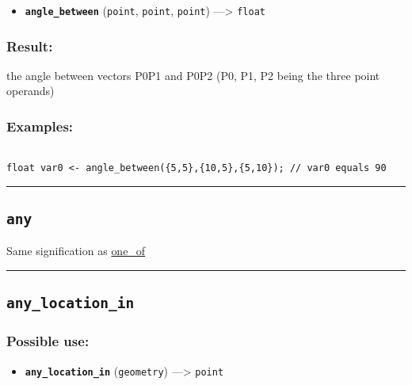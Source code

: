 \documentclass[]{book}
\providecommand{\tightlist}{%
  \setlength{\itemsep}{0pt}\setlength{\parskip}{0pt}}
\theoremstyle{definition}
\theoremstyle{definition}
\theoremstyle{definition}
\theoremstyle{remark}
\begin{document}
\begin{itemize}
\tightlist
\item
  \textbf{\texttt{angle\_between}} (\texttt{point}, \texttt{point},
  \texttt{point}) ---\textgreater{} \texttt{float}
\end{itemize}

\subsubsection{Result:}\label{result-36}

the angle between vectors P0P1 and P0P2 (P0, P1, P2 being the three
point operands)

\subsubsection{Examples:}\label{examples-29}

\begin{verbatim}
 
float var0 <- angle_between({5,5},{10,5},{5,10}); // var0 equals 90
\end{verbatim}

\begin{center}\rule{0.5\linewidth}{\linethickness}\end{center}

\subsection{\texorpdfstring{\texttt{any}}{any}}\label{any}

Same signification as \href{OperatorsNR\#one_of}{one\_of}

\begin{center}\rule{0.5\linewidth}{\linethickness}\end{center}

\subsection{\texorpdfstring{\texttt{any\_location\_in}}{any\_location\_in}}\label{any_location_in}

\subsubsection{Possible use:}\label{possible-use-38}

\begin{itemize}
\tightlist
\item
  \textbf{\texttt{any\_location\_in}} (\texttt{geometry})
  ---\textgreater{} \texttt{point}
\end{itemize}
\end{document}
